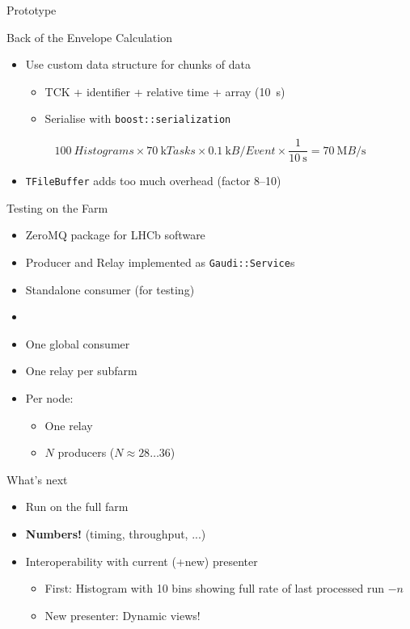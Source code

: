 \documentclass[aspectratio=1610,compress,titleprogressbar]{beamer}
\begin{document}
\begin{frame}{Prototype}
  \begin{block}{Back of the Envelope Calculation}
    \begin{itemize}
      \item Use custom data structure for chunks of data \begin{itemize}
          \item TCK + identifier + relative time + array (\SI{10}{\second})
        \item Serialise with \texttt{boost::serialization}
      \end{itemize}
    \end{itemize}
      
    \begin{equation*}
      \SI{100}{Histograms} \times \SI{70}{\kilo Tasks} \times \SI{0.1}{\kilo B\per Event} \times \frac{\num{1}}{\SI{10}{\second}} = \SI{70}{\mega B\per\second}
    \end{equation*}

    \begin{itemize}
      \item \texttt{TFileBuffer} adds too much overhead (factor \numrange{8}{10})
    \end{itemize}
  \end{block}
\end{frame}

\begin{frame}{Testing on the Farm}
  \begin{itemize}
    \item ZeroMQ package for LHCb software
    \item Producer and Relay implemented as \texttt{Gaudi::Service}s
    \item Standalone consumer (for testing)
    \item [] {}
    \item One global consumer
    \item One relay per subfarm
    \item Per node: \begin{itemize}
      \item One relay
      \item $N$ producers ($N \approx 28 \dots 36$)
    \end{itemize}
  \end{itemize}
\end{frame}

\begin{frame}{What's next}
  \begin{itemize}
    \item Run on the full farm
    \item \textbf{Numbers!} (timing, throughput, ...)
    \item Interoperability with current (+new) presenter \begin{itemize}
      \item First: Histogram with 10 bins showing full rate of last processed run $-n$
      \item New presenter: Dynamic views!
    \end{itemize}
  \end{itemize}
\end{frame}
\end{document}
